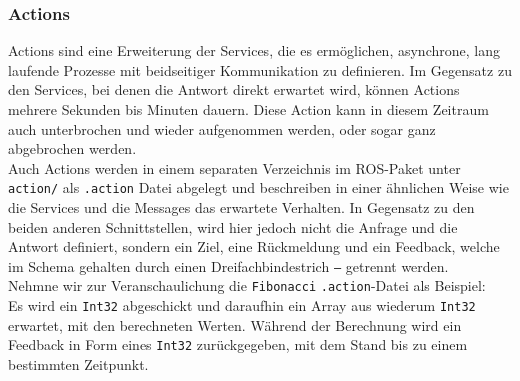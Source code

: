 \subsubsection{Actions}\label{subsubsec:ROS2Actions}
Actions sind eine Erweiterung der Services, die es ermöglichen, asynchrone, lang laufende Prozesse mit beidseitiger Kommunikation zu definieren. Im Gegensatz zu den Services, bei denen die Antwort direkt erwartet wird, können Actions mehrere Sekunden bis Minuten dauern. Diese Action kann in diesem Zeitraum auch unterbrochen und wieder aufgenommen werden, oder sogar ganz abgebrochen werden.\\
Auch Actions werden in einem separaten Verzeichnis im \ac{ROS}-Paket unter \texttt{action/} als \texttt{.action} Datei abgelegt und beschreiben in einer ähnlichen Weise wie die Services und die Messages das erwartete Verhalten. In Gegensatz zu den beiden anderen Schnittstellen, wird hier jedoch nicht die Anfrage und die Antwort definiert, sondern ein Ziel, eine Rückmeldung und ein Feedback, welche im Schema gehalten durch einen Dreifachbindestrich \texttt{---} getrennt werden.\\
Nehmne wir zur Veranschaulichung die \texttt{Fibonacci} \texttt{.action}-Datei als Beispiel:\\
Es wird ein \texttt{Int32} abgeschickt und daraufhin ein Array aus wiederum \texttt{Int32} erwartet, mit den berechneten Werten. Während der Berechnung wird ein Feedback in Form eines \texttt{Int32} zurückgegeben, mit dem Stand bis zu einem bestimmten Zeitpunkt.\\


